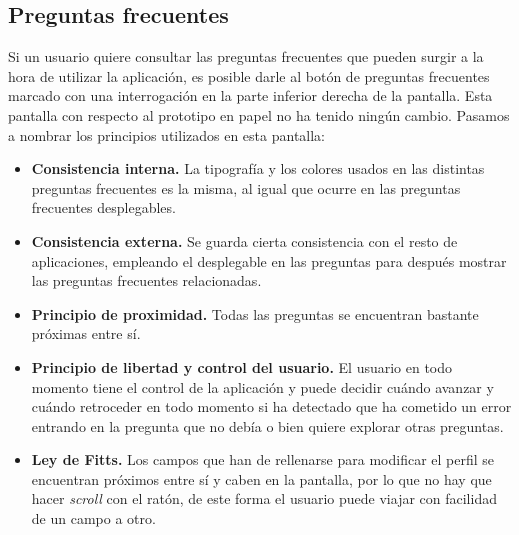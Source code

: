 \subsection*{Preguntas frecuentes}

Si un usuario quiere consultar las preguntas frecuentes que pueden surgir a la hora de utilizar la aplicación,
es posible darle al botón de preguntas frecuentes marcado con una interrogación en la parte inferior derecha
de la pantalla. Esta pantalla con respecto al prototipo en papel no ha tenido ningún cambio. Pasamos a nombrar
los principios utilizados en esta pantalla:

\begin{itemize}
    \item \textbf{Consistencia interna.} La tipografía y los colores usados en las distintas preguntas frecuentes
        es la misma, al igual que ocurre en las preguntas frecuentes desplegables. 
    \item \textbf{Consistencia externa.} Se guarda cierta consistencia con el resto de aplicaciones, empleando el
        desplegable en las preguntas para después mostrar las preguntas frecuentes relacionadas.
    \item \textbf{Principio de proximidad.} Todas las preguntas se encuentran bastante próximas entre sí.
    \item \textbf{Principio de libertad y control del usuario.} El usuario en todo momento tiene el control de la
        aplicación y puede decidir cuándo avanzar y cuándo retroceder en todo momento si ha detectado que ha cometido
        un error entrando en la pregunta que no debía o bien quiere explorar otras preguntas.
    \item \textbf{Ley de Fitts.} Los campos que han de rellenarse para modificar el perfil se encuentran próximos
        entre sí y caben en la pantalla, por lo que no hay que hacer \textit{scroll} con el ratón, de este forma el
        usuario puede viajar con facilidad de un campo a otro.
\end{itemize}